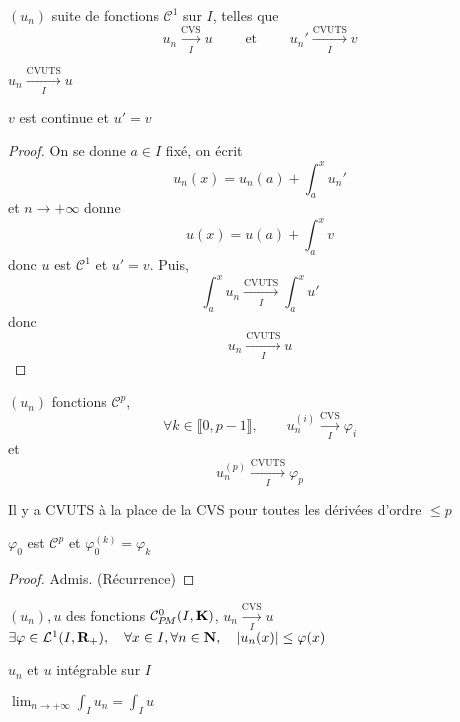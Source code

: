 \begin{thm}[Dérivation]
    \Hyp $(u_n)$ suite de fonctions $\mathcal  C^1$ sur  $I$, telles que \[
        u_n \xrightarrow[I]{\text{CVS}}u \qquad  \text{ et }\qquad  u_n' \xrightarrow[I]{\text{CVUTS}}v
    \] 
    \begin{concenum}
    \item  $u_n \xrightarrow[I]{\text{CVUTS}}u$
    \item $v$ est continue et  $u'=v$
    \end{concenum}
\end{thm}

\begin{proof}
    On se donne  $a \in  I$ fixé, on écrit \[
        u_n(x)=u_n(a)+\int_a^xu_n'
    \] 
    et $n\to +\infty$ donne \[
        u(x)=u(a)+\int_a^xv
    \] 
    donc $u$ est  $\mathcal C^1$ et $u'=v$. Puis,  \[
        \int_a^xu_n \xrightarrow[I]{\text{CVUTS}}\int_a^x u'
    \] 
    donc \[
        u_n \xrightarrow[I]{\text{CVUTS}}u
    \] 
\end{proof}

\begin{thm}
    \Hyp {} $(u_n)$ fonctions  $\mathcal  C^p$, \[
        \forall  k \in  \llbracket 0, p-1 \rrbracket , \qquad  u_n^{(i)}\xrightarrow[I]{\text{CVS}}\varphi_i
    \] 
    et  \[
        u_n^{(p)}\xrightarrow[I]{\text{CVUTS}}\varphi_p
    \] 
    \begin{concenum}
    \item Il y a CVUTS à la place de la CVS pour toutes les dérivées d'ordre  $\leq p$
    \item $\varphi_0$ est  $\mathcal  C^p$ et $\varphi_0^{(k)}=\varphi_k$
    \end{concenum}
\end{thm}

\begin{proof}
    Admis. (Récurrence)
\end{proof}

\begin{thm}
    \Hyp $(u_n), u$ des fonctions  $\CPM(I, \K)$, $u_n \xrightarrow[I]{\text{CVS}}u$\\ $ \exists \varphi \in  \mathcal  L^1(I, \mathbf R_+), \quad  \forall  x \in  I, \forall  n \in  \mathbf N, \quad  |u_n(x)|\leq \varphi(x)$
    \begin{concenum}
    \item $u_n$ et $u$ intégrable sur $I$
    \item  $\displaystyle \lim_{n\to +\infty}\int_Iu_n=\int_Iu$
    \end{concenum}
\end{thm}

